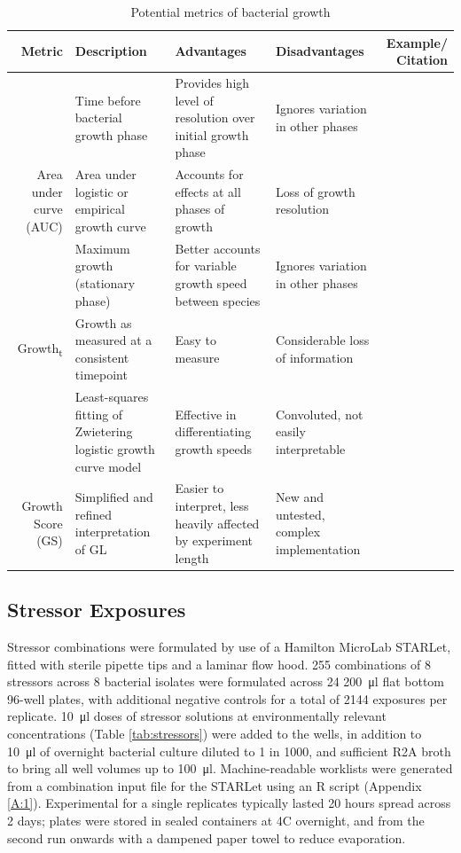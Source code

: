 \documentclass[final,1p,times]{elsarticle}
\begin{document}
\begin{table}[ht]
\centering
\scriptsize
\begin{tabular}{N M L L N}
\toprule 
\textbf{Metric} & \textbf{Description} & \textbf{Advantages} & \textbf{Disadvantages} & \textbf{Example/ Citation} \\
\midrule
{} & Time before bacterial growth phase & Provides high level of resolution over initial growth phase & Ignores variation in other phases & \cite{Monod1949} \\
{Area under curve (AUC)} & Area under logistic or empirical growth curve & Accounts for effects at all phases of growth & Loss of growth resolution & \cite{Firsov2001} \\
 & Maximum growth (stationary phase) & Better accounts for variable growth speed between species & Ignores variation in other phases & \cite{Chapman2018} \\
{Growth\textsubscript{t}} & Growth as measured at a consistent timepoint & Easy to measure & Considerable loss of information & \cite{Hall2014} \\
 & Least-squares fitting of Zwietering logistic growth curve model & Effective in differentiating growth speeds &  Convoluted, not easily interpretable & \cite{Cuevas2017,Cuevas2018}\\
{Growth Score (GS)} & Simplified and refined interpretation of GL & Easier to interpret, less heavily affected by experiment length & New and untested, complex implementation & \cite{Cuevas2018}\\
\bottomrule
\end{tabular}
\caption{Potential metrics of bacterial growth}
\label{tab:metrics}
\end{table}

\subsection{Stressor Exposures}
\label{S:2:5}

Stressor combinations were formulated by use of a Hamilton MicroLab STARLet, fitted with sterile  pipette tips and a laminar flow hood. 255 combinations of 8 stressors across 8 bacterial isolates were formulated across 24 \SI{200}{\ul} flat bottom 96-well plates, with additional negative controls for a total of 2144 exposures per replicate. \SI{10}{\ul} doses of stressor solutions at environmentally relevant concentrations (Table \ref{tab:stressors}) were added to the wells, in addition to \SI{10}{\ul} of overnight bacterial culture diluted to 1 in 1000, and sufficient R2A broth to bring all well volumes up to \SI{100}{\ul}. Machine-readable worklists were generated from a combination input file for the STARLet using an R script (Appendix \ref{A:1}). Experimental for a single replicates typically lasted 20 hours spread across 2 days; plates were stored in sealed containers at 4\textdegree C overnight, and from the second run onwards with a dampened paper towel to reduce evaporation.
\end{document}
